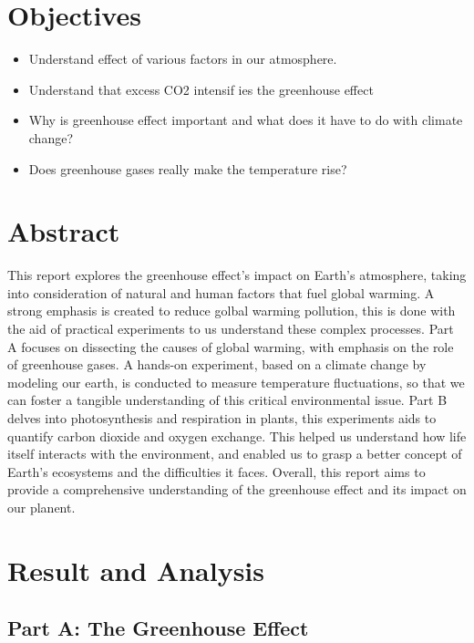 \documentclass[a4paper, 12pt, english]{article}
\begin{document}


\newpage
\section{Objectives}
\begin{itemize}
	\item Understand effect of various factors in our atmosphere.
	\item Understand that excess CO2 intensif ies the greenhouse effect
	\item Why is greenhouse effect important and what does it have to do with climate
	      change?
	\item Does greenhouse gases really make the temperature rise?
\end{itemize}
\section{Abstract}
This report explores the greenhouse effect's impact on Earth's atmosphere,
taking into consideration of natural and human factors that fuel global
warming. A strong emphasis is created to reduce golbal warming pollution, this
is done with the aid of practical experiments to us understand these complex
processes. Part A focuses on dissecting the causes of global warming, with
emphasis on the role of greenhouse gases. A hands-on experiment, based on a
climate change by modeling our earth, is conducted to measure temperature
fluctuations, so that we can foster a tangible understanding of this critical
environmental issue. Part B delves into photosynthesis and respiration in
plants, this experiments aids to quantify carbon dioxide and oxygen exchange.
This helped us understand how life itself interacts with the environment, and
enabled us to grasp a better concept of Earth's ecosystems and the difficulties
it faces. Overall, this report aims to provide a comprehensive understanding of
the greenhouse effect and its impact on our planent.
\section{Result and Analysis}
\subsection{Part A: The Greenhouse Effect}
\end{document}
